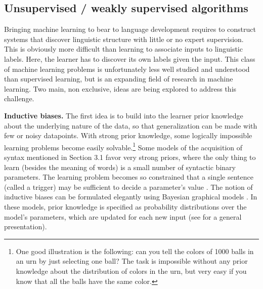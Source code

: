 \documentclass[jou,apacite]{apa6}
\renewcommand{\subsubsection}[1]{\textbf{#1}\hspace{0.3cm}}
\begin{document}
\subsection{Unsupervised / weakly supervised algorithms}

Bringing machine learning to bear to language development requires to construct systems that discover linguistic structure with little or no expert supervision.  This is
obviously more difficult than learning to associate inputs to linguistic labels. Here, the learner has to discover its own labels given the input.  This class of machine learning problems is unfortunately less well studied and understood than supervised learning, but is an expanding field of research in machine learning. Two main, non exclusive, ideas are being explored to address this challenge. 









\subsubsection{Inductive biases.}  The first idea is to build into the learner %
 prior knowledge about the underlying nature of the data, so that generalization can be made with few or noisy datapoints. %
With strong prior knowledge, some logically impossible learning problems become easily solvable.\footnote{One good illustration is the following: can you tell the colors of 1000 balls in an urn by just selecting one ball? The task is impossible without any prior knowledge about the distribution of colors in the urn, but very easy if you know that all the balls have the same color.} %
Some models of the acquisition of syntax mentioned in Section 3.1 favor very strong priors, where the only thing to learn (besides the meaning of words) is a small number of syntactic binary parameters. The learning problem becomes so constrained that a single sentence (called a trigger) may be sufficient to decide a parameter's value \cite{gibson_1994,sakas_2012}. The notion of inductive biases can be formulated elegantly using Bayesian graphical models \cite{pearl_probabilistic_1997,koller_2009}. In these models, prior knowledge is specified as probability distributions over the model's parameters, which are updated for each new input (see  for a general presentation). 
\end{document}
